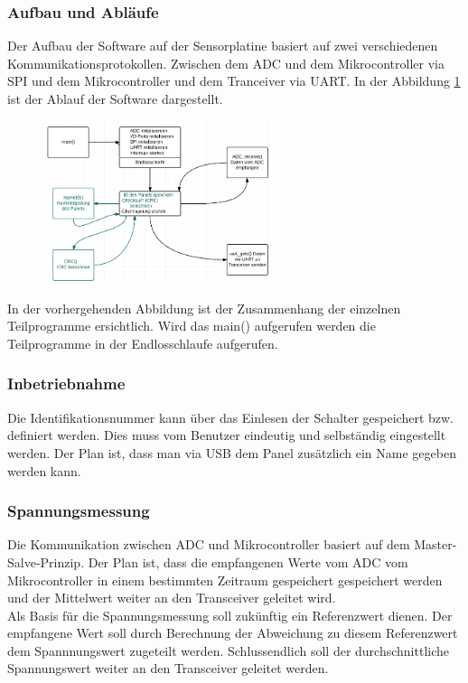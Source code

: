 \subsubsection{Aufbau und Abläufe}
Der Aufbau der Software auf der Sensorplatine basiert auf zwei verschiedenen Kommunikationsprotokollen. Zwischen dem ADC und dem Mikrocontroller via SPI und dem Mikrocontroller und dem Tranceiver via UART. In der Abbildung \ref{DiagrammSP} ist der Ablauf der Software dargestellt.
\begin{figure}
\centering
\includegraphics[width=0.6\textwidth]{data/Sensorplatine}
\label{DiagrammSP}
\end{figure}
In der vorhergehenden Abbildung ist der Zusammenhang der einzelnen Teilprogramme ersichtlich. Wird das main() aufgerufen werden die Teilprogramme in der Endlosschlaufe aufgerufen.
\subsubsection{Inbetriebnahme}
Die Identifikationsnummer kann über das Einlesen der Schalter gespeichert bzw. definiert werden. Dies muss vom Benutzer eindeutig und selbständig eingestellt werden. Der Plan ist, dass man via USB dem Panel zusätzlich ein Name gegeben werden kann.
\subsubsection{Spannungsmessung}
Die Kommunikation zwischen ADC und Mikrocontroller basiert auf dem Master-Salve-Prinzip. Der Plan ist, dass die empfangenen Werte vom ADC vom Mikrocontroller in einem bestimmten Zeitraum gespeichert gespeichert werden und der Mittelwert weiter an den Transceiver geleitet wird.\\
Als Basis für die Spannungsmessung soll zukünftig ein Referenzwert dienen. Der empfangene Wert soll durch Berechnung der Abweichung zu diesem Referenzwert dem Spannnungswert zugeteilt werden. Schlussendlich soll der durchschnittliche Spannungswert weiter an den Transceiver geleitet werden.
